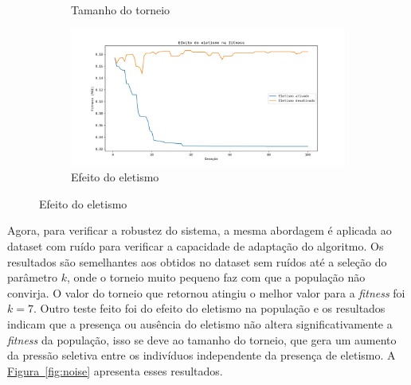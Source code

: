 \documentclass[a4paper]{article}
\begin{document}
\begin{figure}[h]
\begin{subfigure}[t]{0.5\textwidth}
      \caption{Tamanho do torneio}
      \label{fig:sr_div_k}
    \end{subfigure}
    \begin{subfigure}[t]{0.5\textwidth}
      \includegraphics[width=\textwidth]{sr_div_eletism}
      \caption{Efeito do eletismo}
      \label{fig:sr_div_eletism}
    \end{subfigure}
\end{figure}

Agora, para verificar a robustez do sistema, a mesma abordagem é aplicada ao
dataset com ruído para verificar a capacidade de adaptação do algoritmo. Os
resultados são semelhantes aos obtidos no dataset sem ruídos até a seleção do
parâmetro $k$, onde o torneio muito pequeno faz com que a população não
convirja. O valor do torneio que retornou atingiu o melhor valor para a
\textit{fitness} foi $k=7$. Outro teste feito foi do efeito do eletismo na
população e os resultados indicam que a presença ou ausência do eletismo não
altera significativamente a \textit{fitness} da população, isso se deve ao
tamanho do torneio, que gera um aumento da pressão seletiva entre os indivíduos
independente da presença de eletismo. A
\hyperref[fig:noise]{Figura~\ref*{fig:noise}} apresenta esses resultados.
\end{document}
